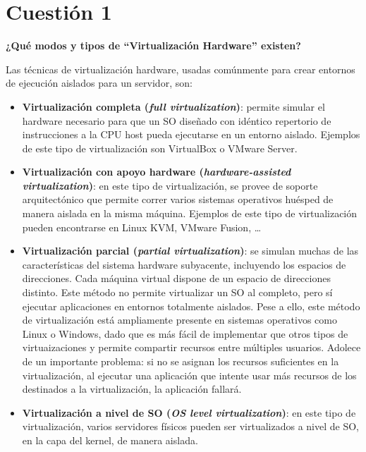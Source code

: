 \documentclass[a4paper,11pt]{article}
\newenvironment{answer}{%
\begin{list}{}{%
\addtolength{\hoffset}{0cm}
}%
\item[]}{\end{list}}
\newcommand{\imagent}[4]{
  \begin{figure}
    \begin{center}
    \texttt{[image: \#1]}
    \end{center}
    \caption{#3}
    \label{#4}
  \end{figure}
}
\newcommand{\imagen}[3]{
  \begin{figure}[H]
    \begin{center}
    \texttt{[image: \#1]}
    \end{center}
    \caption{#2}
    \label{#3}
  \end{figure}
}
\begin{document}
\newpage
\tableofcontents
\newpage

\section{Cuestión 1}
\textbf{¿Qué modos y tipos de “Virtualización Hardware” existen?}
\begin{answer}
 Las técnicas de virtualización hardware, usadas comúnmente para crear entornos de ejecución aislados para un 
 servidor, son: \cite{hardv} \cite{virt}
 \begin{itemize}
  \item \textbf{Virtualización completa (\textit{full virtualization})}: permite simular el hardware necesario
  para que un SO diseñado con idéntico repertorio de instrucciones a la CPU host pueda ejecutarse en un entorno
  aislado. Ejemplos de este tipo de virtualización son VirtualBox o VMware Server.
  \item \textbf{Virtualización con apoyo hardware (\textit{hardware-assisted virtualization})}: en este tipo
  de virtualización, se provee de soporte arquitectónico que permite correr varios sistemas operativos 
  huésped de manera aislada en la misma máquina. Ejemplos de este tipo de virtualización pueden encontrarse
  en Linux KVM, VMware Fusion, \ldots
  \item \textbf{Virtualización parcial (\textit{partial virtualization})}: se simulan muchas de las características
  del sistema hardware subyacente, incluyendo los espacios de direcciones. Cada máquina virtual dispone de un
  espacio de direcciones distinto. Este método no permite virtualizar un SO al completo, pero sí ejecutar
  aplicaciones en entornos totalmente aislados. Pese a ello, este método de virtualización está ampliamente
  presente en sistemas operativos como Linux o Windows, dado que es más fácil de implementar que otros
  tipos de virtuaizaciones y permite compartir recursos entre múltiples usuarios. Adolece de un importante problema:
  si no se asignan los recursos suficientes en la virtualización, al ejecutar una aplicación que intente
  usar más recursos de los destinados a la virtualización, la aplicación fallará.
  \item \textbf{Virtualización a nivel de SO (\textit{OS level virtualization})}: en este tipo de virtualización,
  varios servidores físicos pueden ser virtualizados a nivel de SO, en la capa del kernel, de manera aislada. 

\end{itemize}
\end{answer}
\end{document}
